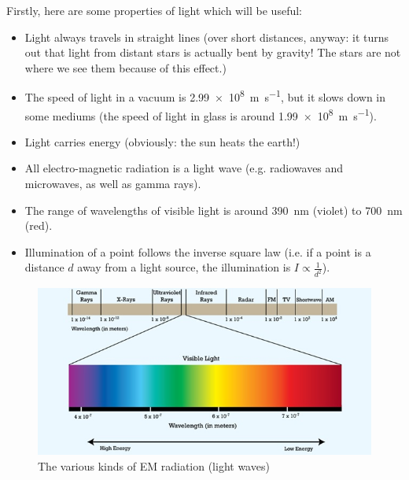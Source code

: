 \documentclass[a4paper]{amsbook}
\newcommand\capcite[1]{}
\begin{document}
Firstly, here are some properties of light which will be useful:
\begin{itemize}
  \item Light always travels in straight lines (over short distances, anyway: it turns out that light from distant stars is actually bent
        by gravity! The stars are not where we see them because of this effect.)
  \item The speed of light in a vacuum is \SI{2.99e8}{\metre\per\second}, but it slows down in some mediums (the speed of
        light in glass is around \SI{1.99e8}{\metre\per\second}).
  \item Light carries energy (obviously: the sun heats the earth!)
  \item All electro-magnetic radiation is a light wave (e.g. radiowaves and microwaves, as well as gamma rays).
  \item The range of wavelengths of visible light is around \SI{390}{\nano\metre} (violet) to \SI{700}{\nano\metre} (red).
  \item Illumination of a point follows the inverse square law (i.e. if a point is a distance $ d $ away from a light source,
        the illumination is $ I \propto \frac{1}{d^2} $).
\end{itemize}

\begin{figure}
  \centering
  \includegraphics[width=\textwidth]{visible-light-1}
  \caption{The various kinds of EM radiation (light waves) \capcite{http://byjus.com/physics/wp-content/uploads/2016/06/Visible-light-1.jpg}\label{fig:visible}}
\end{figure}
\end{document}
